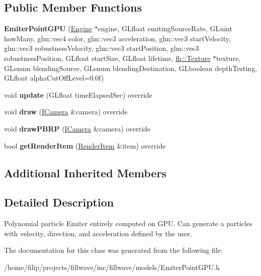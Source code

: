 \subsection*{Public Member Functions}
\begin{DoxyCompactItemize}
\item 
\mbox{\label{classflw_1_1flf_1_1EmiterPointGPU_a63b5c560ccc89f38bd0c974372eda1cf}} 
{\bfseries Emiter\+Point\+G\+PU} (\hyperlink{classflw_1_1Engine}{Engine} $\ast$engine, G\+Lfloat emiting\+Source\+Rate, G\+Luint how\+Many, glm\+::vec4 color, glm\+::vec3 acceleration, glm\+::vec3 start\+Velocity, glm\+::vec3 robustness\+Velocity, glm\+::vec3 start\+Position, glm\+::vec3 robustness\+Position, G\+Lfloat start\+Size, G\+Lfloat lifetime, \hyperlink{classflw_1_1flc_1_1Texture}{flc\+::\+Texture} $\ast$texture, G\+Lenum blending\+Source, G\+Lenum blending\+Destination, G\+Lboolean depth\+Testing, G\+Lfloat alpha\+Cut\+Off\+Level=0.\+0f)
\item 
\mbox{\label{classflw_1_1flf_1_1EmiterPointGPU_a6c816e0fb1b4626c814012dcf3d81d10}} 
void {\bfseries update} (G\+Lfloat time\+Elapsed\+Sec) override
\item 
\mbox{\label{classflw_1_1flf_1_1EmiterPointGPU_ae6a1e9b822d2d121f5c9403a3a032d2a}} 
void {\bfseries draw} (\hyperlink{classflw_1_1flf_1_1ICamera}{I\+Camera} \&camera) override
\item 
\mbox{\label{classflw_1_1flf_1_1EmiterPointGPU_a7233c34c58d55abd33c7cbfcbffe272b}} 
void {\bfseries draw\+P\+B\+RP} (\hyperlink{classflw_1_1flf_1_1ICamera}{I\+Camera} \&camera) override
\item 
\mbox{\label{classflw_1_1flf_1_1EmiterPointGPU_a1a3f0a9adb28d5051b767d4c18b6c51f}} 
bool {\bfseries get\+Render\+Item} (\hyperlink{structflw_1_1flf_1_1RenderItem}{Render\+Item} \&item) override
\end{DoxyCompactItemize}
\subsection*{Additional Inherited Members}


\subsection{Detailed Description}
Polynomial particle Emiter entirely computed on G\+PU. Can generate a particles with velocity, direction, and acceleration defined by the user. 

The documentation for this class was generated from the following file\+:\begin{DoxyCompactItemize}
\item 
/home/filip/projects/fillwave/inc/fillwave/models/Emiter\+Point\+G\+P\+U.\+h\end{DoxyCompactItemize}
